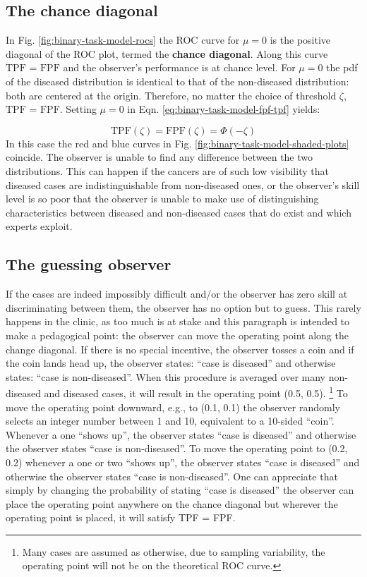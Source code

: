 \documentclass[
]{book}
\begin{document}
\hypertarget{binary-task-model-chance-diagonal}{%
\subsection{The chance diagonal}\label{binary-task-model-chance-diagonal}}

In Fig. \ref{fig:binary-task-model-rocs} the ROC curve for \(\mu=0\) is the positive diagonal of the ROC plot, termed the \textbf{chance diagonal}. Along this curve \(\text{TPF = FPF}\) and the observer's performance is at chance level. For \(\mu=0\) the pdf of the diseased distribution is identical to that of the non-diseased distribution: both are centered at the origin. Therefore, no matter the choice of threshold \(\zeta\), \(\text{TPF = FPF}\). Setting \(\mu=0\) in Eqn. \eqref{eq:binary-task-model-fpf-tpf} yields:

\[\text{TPF}\left ( \zeta \right )=\text{FPF}\left ( \zeta \right )=\Phi\left ( -\zeta \right )\]
In this case the red and blue curves in Fig. \ref{fig:binary-task-model-shaded-plots} coincide. The observer is unable to find any difference between the two distributions. This can happen if the cancers are of such low visibility that diseased cases are indistinguishable from non-diseased ones, or the observer's skill level is so poor that the observer is unable to make use of distinguishing characteristics between diseased and non-diseased cases that do exist and which experts exploit.

\hypertarget{binary-task-model-guessing-observer}{%
\subsection{The guessing observer}\label{binary-task-model-guessing-observer}}

If the cases are indeed impossibly difficult and/or the observer has zero skill at discriminating between them, the observer has no option but to guess. This rarely happens in the clinic, as too much is at stake and this paragraph is intended to make a pedagogical point: the observer can move the operating point along the change diagonal. If there is no special incentive, the observer tosses a coin and if the coin lands head up, the observer states: ``case is diseased'' and otherwise states: ``case is non-diseased''. When this procedure is averaged over many non-diseased and diseased cases, it will result in the operating point (0.5, 0.5). \footnote{Many cases are assumed as otherwise, due to sampling variability, the operating point will not be on the theoretical ROC curve.} To move the operating point downward, e.g., to (0.1, 0.1) the observer randomly selects an integer number between 1 and 10, equivalent to a 10-sided ``coin''. Whenever a one ``shows up'', the observer states ``case is diseased'' and otherwise the observer states ``case is non-diseased''. To move the operating point to (0.2, 0.2) whenever a one or two ``shows up'', the observer states ``case is diseased'' and otherwise the observer states ``case is non-diseased''. One can appreciate that simply by changing the probability of stating ``case is diseased'' the observer can place the operating point anywhere on the chance diagonal but wherever the operating point is placed, it will satisfy TPF = FPF.
\end{document}
